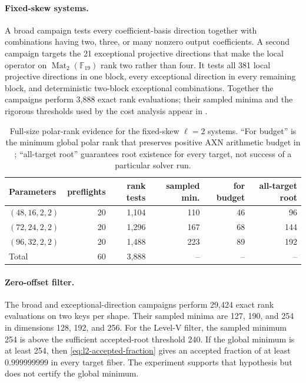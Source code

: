 \documentclass[11pt]{article}
\newcommand{\F}{\mathbb F}
\newcommand{\Mat}{\operatorname{Mat}}
\begin{document}
\paragraph{Fixed-skew systems.}
A broad campaign tests every coefficient-basis direction together with
combinations having two, three, or many nonzero output coefficients.  A second campaign targets
the 21 exceptional projective directions that make the local operator on
$\Mat_2(\F_{19})$ rank two rather than four.  It tests all 381 local
projective directions in one block, every exceptional direction in every
remaining block, and deterministic two-block exceptional combinations.
Together the campaigns perform 3,888 exact rank evaluations; their sampled
minima and the rigorous thresholds used by the cost analysis appear in
.

\begin{table}[tbp]
\centering
\caption{Full-size polar-rank evidence for the fixed-skew $\ell=2$ systems.
``For budget'' is the minimum global polar rank that preserves positive AXN
arithmetic budget in ; ``all-target root'' guarantees root
existence for every target, not success of a particular solver run.}
\label{tab:fixed-skew-evidence}
\small
\setlength{\tabcolsep}{4.5pt}
\begin{tabular}{@{}l r r r r r@{}}
\toprule
Parameters & preflights & rank tests & sampled min. & for budget & all-target root\\
\midrule
$(48,16,2,2)$ & 20 & 1,104 & 110 & 46 & 96\\
$(72,24,2,2)$ & 20 & 1,296 & 167 & 68 & 144\\
$(96,32,2,2)$ & 20 & 1,488 & 223 & 89 & 192\\
\midrule
Total & 60 & 3,888 & -- & -- & --\\
\bottomrule
\end{tabular}
\end{table}

\paragraph{Zero-offset filter.}
The broad and exceptional-direction campaigns perform 29,424 exact rank
evaluations on two keys per shape.  Their sampled minima are 127, 190, and 254
in dimensions 128, 192, and 256.  For the Level-V filter, the sampled minimum 254 is above the sufficient
accepted-root threshold 240.  If the global minimum is at least 254, then
\eqref{eq:l2-accepted-fraction} gives an accepted fraction of at least
$0.999999999$ in every target fiber.  The experiment supports that hypothesis
but does not certify the global minimum.
\end{document}
